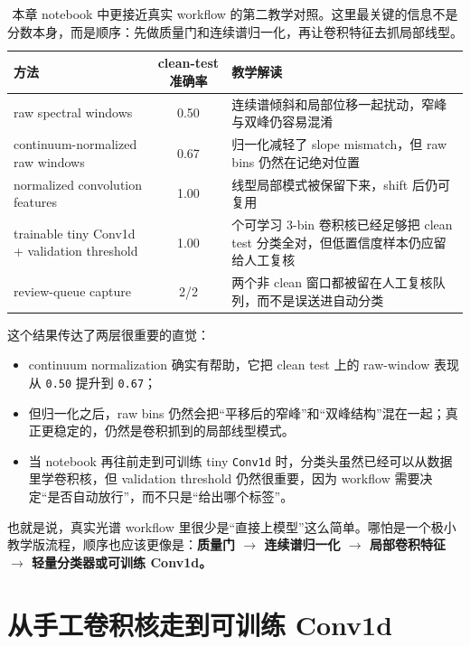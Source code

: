 \begin{table}[htbp]
\centering
\small
\begin{tabular}{>{\raggedright\arraybackslash}p{}c>{\raggedright\arraybackslash}p{}}
\toprule
方法 & clean-test 准确率 & 教学解读 \\
\midrule
raw spectral windows & 0.50 & 连续谱倾斜和局部位移一起扰动，窄峰与双峰仍容易混淆 \\
continuum-normalized raw windows & 0.67 & 归一化减轻了 slope mismatch，但 raw bins 仍然在记绝对位置 \\
normalized convolution features & 1.00 & 线型局部模式被保留下来，shift 后仍可复用 \\
trainable tiny Conv1d + validation threshold & 1.00 & 3 个可学习 3-bin 卷积核已经足够把 clean test 分类全对，但低置信度样本仍应留给人工复核 \\
review-queue capture & 2/2 & 两个非 clean 窗口都被留在人工复核队列，而不是误送进自动分类 \\
\bottomrule
\end{tabular}
\caption{本章 notebook 中更接近真实 workflow 的第二教学对照。这里最关键的信息不是分数本身，而是顺序：先做质量门和连续谱归一化，再让卷积特征去抓局部线型。}
\label{tab:ch32_workflow_extension}
\end{table}

这个结果传达了两层很重要的直觉：

\begin{itemize}
    \item continuum normalization 确实有帮助，它把 clean test 上的 raw-window 表现从 \texttt{0.50} 提升到 \texttt{0.67}；
    \item 但归一化之后，raw bins 仍然会把“平移后的窄峰”和“双峰结构”混在一起；真正更稳定的，仍然是卷积抓到的局部线型模式。
    \item 当 notebook 再往前走到可训练 tiny \texttt{Conv1d} 时，分类头虽然已经可以从数据里学卷积核，但 validation threshold 仍然很重要，因为 workflow 需要决定“是否自动放行”，而不只是“给出哪个标签”。
\end{itemize}

也就是说，真实光谱 workflow 里很少是“直接上模型”这么简单。哪怕是一个极小教学版流程，顺序也应该更像是：\textbf{质量门 $\rightarrow$ 连续谱归一化 $\rightarrow$ 局部卷积特征 $\rightarrow$ 轻量分类器或可训练 Conv1d。}

\section{从手工卷积核走到可训练 Conv1d}


